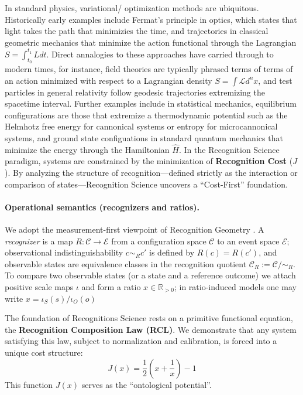 \documentclass[11pt,a4paper]{article}
\begin{document}
 In standard physics, variational/ optimization methods are ubiquitous. Historically early examples include  Fermat's principle  in optics, which states that light takes the path that minimizies the time\cite{Feynman:1963uxa}, and trajectories in classical geometric mechanics that minimize the action functional through the Lagrangian $S=\int_{t_0}^{t_1} L dt$\cite{Arnold:1989who,TongDynamics}. Direct annalogies to these approaches have carried through to modern times, for instance, field theories are typically phrased terms of terms of an action minimized with respect to a Lagrangian density $S=\int\mathcal{L} d^n x$\cite{Peskin:1995ev,10.1093/acprof:oso/9780199699322.001.0001}, and test particles in general relativity follow geodesic trajectories extremizing the spacetime interval\cite{1984ucp..book.....W,Carroll:1997ar}. Further examples include in statistical mechanics, equilibrium configurations are those that extremize a thermodynamic potential such as the Helmhotz free energy for cannonical systems or entropy for microcannonical systems\cite{TongStatMech}, and  ground state configuations in standard quantum mechanics  that minimize the energy through the Hamiltonian $\hat{H}$\cite{Sakurai_Napolitano_2020}. In the Recognition Science paradigm, systems are constrained by the minimization of \textbf{Recognition Cost} ($J$). By analyzing the structure of recognition—defined strictly as the interaction or comparison of states—Recognition Science uncovers a ``Cost-First'' foundation.





\paragraph{Operational semantics (recognizers and ratios).}
We adopt the measurement-first viewpoint of Recognition Geometry \cite{RecognitionGeometry}. A \emph{recognizer} is a map $R:\mathcal{C}\to\mathcal{E}$ from a configuration space $\mathcal{C}$ to an event space $\mathcal{E}$; observational indistinguishability $c\sim_R c'$ is defined by $R(c)=R(c')$, and observable states are equivalence classes in the recognition quotient $\mathcal{C}_R:=\mathcal{C}/\!\sim_R$. To compare two observable states (or a state and a reference outcome) we attach positive scale maps $\iota$ and form a ratio $x\in\mathbb{R}_{>0}$; in ratio-induced models one may write $x=\iota_S(s)/\iota_O(o)$ \cite{EntropyInterface}

The foundation of Recognitions Science rests on a primitive functional equation, the \textbf{Recognition Composition Law (RCL)}. We demonstrate that any system satisfying this law, subject to normalization and calibration, is forced into a unique cost structure:
\begin{equation}
    J(x) = \frac{1}{2}\left(x + \frac{1}{x}\right) - 1
    \label{jcost1}
\end{equation}
This function $J(x)$ serves as the ``ontological potential''.
\end{document}
